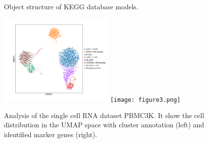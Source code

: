 \documentclass[11pt,a4paper]{article}
\begin{document}
\newpage

\printbibliography %

\newpage





\begin{figure}


    \caption{Object structure of KEGG database models.}
\end{figure}


\begin{figure}

    \includegraphics[width=0.5\textwidth, valign=t]{figure2.png}
    \texttt{[image: figure3.png]}

    \caption{Analysis of the single cell RNA dataset PBMC3K. It show the cell distribution in the UMAP space with
    cluster annotation (left) and identified marker genes (right).
    }
\end{figure}
\end{document}
